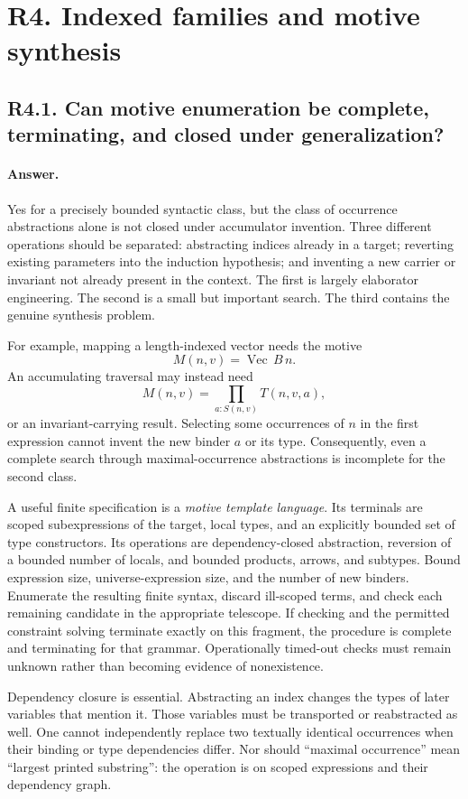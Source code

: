 \documentclass[11pt,a4paper]{article}
\newcommand{\answer}{\paragraph{Answer.}}
\theoremstyle{definition}
\theoremstyle{remark}
\begin{document}
\section{R4. Indexed families and motive synthesis}
\label{sec:r4}

\subsection{R4.1. Can motive enumeration be complete, terminating, and closed under generalization?}
\answer Yes for a precisely bounded syntactic class, but the class of occurrence
abstractions alone is not closed under accumulator invention. Three different
operations should be separated: abstracting indices already in a target;
reverting existing parameters into the induction hypothesis; and inventing a
new carrier or invariant not already present in the context. The first is
largely elaborator engineering. The second is a small but important search.
The third contains the genuine synthesis problem.

For example, mapping a length-indexed vector needs the motive
\[
 M(n,v)=\operatorname{Vec}\,B\,n.
\]
An accumulating traversal may instead need
\[
 M(n,v)=\prod_{a:S(n,v)}T(n,v,a),
\]
or an invariant-carrying result. Selecting some occurrences of $n$ in the first
expression cannot invent the new binder $a$ or its type. Consequently, even a
complete search through maximal-occurrence abstractions is incomplete for the
second class.

A useful finite specification is a \emph{motive template language}. Its terminals
are scoped subexpressions of the target, local types, and an explicitly bounded
set of type constructors. Its operations are dependency-closed abstraction,
reversion of a bounded number of locals, and bounded products, arrows, and
subtypes. Bound expression size, universe-expression size, and the number of
new binders. Enumerate the resulting finite syntax, discard ill-scoped terms,
and check each remaining candidate in the appropriate telescope. If checking
and the permitted constraint solving terminate exactly on this fragment, the
procedure is complete and terminating for that grammar. Operationally timed-out
checks must remain unknown rather than becoming evidence of nonexistence.

Dependency closure is essential. Abstracting an index changes the types of
later variables that mention it. Those variables must be transported or
reabstracted as well. One cannot independently replace two textually identical
occurrences when their binding or type dependencies differ. Nor should
``maximal occurrence'' mean ``largest printed substring'': the operation is on
scoped expressions and their dependency graph.
\end{document}
